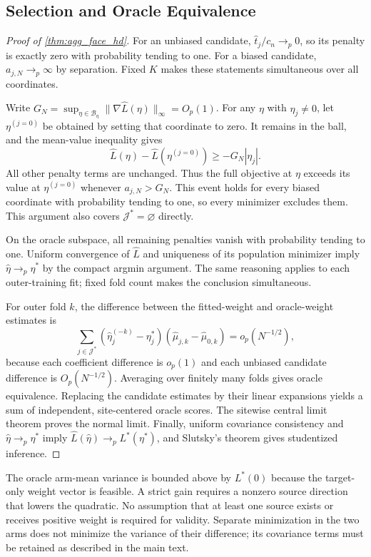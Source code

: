 \documentclass[12pt]{article}
\begin{document}
\subsection{Selection and Oracle Equivalence}\label{supp:aggregation_supporting_lemmas}\label{supp:aggregation_main_proofs}
\begin{proof}[Proof of \cref{thm:agg_face_hd}]
For an unbiased candidate, $\widehat t_j/c_n\to_p0$, so its penalty is exactly zero with probability tending to one. For a biased candidate, $a_{j,N}\to_p\infty$ by separation. Fixed $K$ makes these statements simultaneous over all coordinates.

Write $G_N=\sup_{\eta\in\mathcal B_\eta}\|\nabla\widehat L(\eta)\|_\infty=O_p(1)$. For any $\eta$ with $\eta_j\ne0$, let $\eta^{(j=0)}$ be obtained by setting that coordinate to zero. It remains in the ball, and the mean-value inequality gives
\[
\widehat L(\eta)-\widehat L(\eta^{(j=0)})\ge-G_N|\eta_j|.
\]
All other penalty terms are unchanged. Thus the full objective at $\eta$ exceeds its value at $\eta^{(j=0)}$ whenever $a_{j,N}>G_N$. This event holds for every biased coordinate with probability tending to one, so every minimizer excludes them. This argument also covers $\mathcal J^*=\varnothing$ directly.

On the oracle subspace, all remaining penalties vanish with probability tending to one. Uniform convergence of $\widehat L$ and uniqueness of its population minimizer imply $\widehat\eta\to_p\eta^*$ by the compact argmin argument. The same reasoning applies to each outer-training fit; fixed fold count makes the conclusion simultaneous.

For outer fold $k$, the difference between the fitted-weight and oracle-weight estimates is
\[
\sum_{j\in\mathcal J^*}(\widehat\eta_j^{(-k)}-\eta_j^*)
(\widehat\mu_{j,k}-\widehat\mu_{0,k})
=o_p(N^{-1/2}),
\]
because each coefficient difference is $o_p(1)$ and each unbiased candidate difference is $O_p(N^{-1/2})$. Averaging over finitely many folds gives oracle equivalence. Replacing the candidate estimates by their linear expansions yields a sum of independent, site-centered oracle scores. The sitewise central limit theorem proves the normal limit. Finally, uniform covariance consistency and $\widehat\eta\to_p\eta^*$ imply $\widehat L(\widehat\eta)\to_p L^*(\eta^*)$, and Slutsky's theorem gives studentized inference.
\end{proof}

The oracle arm-mean variance is bounded above by $L^*(0)$ because the target-only weight vector is feasible. A strict gain requires a nonzero source direction that lowers the quadratic. No assumption that at least one source exists or receives positive weight is required for validity. Separate minimization in the two arms does not minimize the variance of their difference; its covariance terms must be retained as described in the main text.
\end{document}

